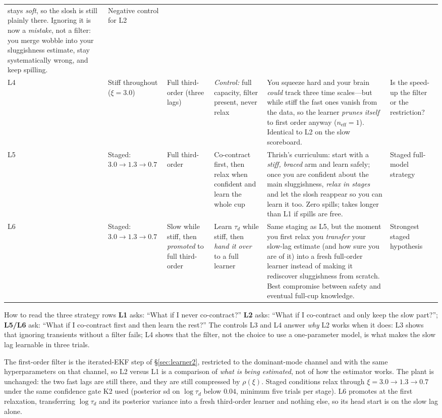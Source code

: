 \documentclass[11pt,a4paper]{article}
\newcommand{\neff}{n_{\mathrm{eff}}}
\begin{document}
\begin{longtable}{@{}p{0.7cm}p{1.5cm}p{2.0cm}p{2.2cm}p{4.8cm}p{2.6cm}@{}}
stays \emph{soft}, so the slosh is still plainly there.  Ignoring it is
now a \emph{mistake}, not a filter: you merge wobble into your sluggishness
estimate, stay systematically wrong, and keep spilling. &
Negative control for L2 \\
\addlinespace
L4 &
Stiff throughout ($\xi=3.0$) &
Full third-order (three lags) &
\emph{Control:} full capacity, filter present, never relax &
You squeeze hard and your brain \emph{could} track three time scales---but
while stiff the fast ones vanish from the data, so the learner \emph{prunes
itself} to first order anyway ($\neff=1$).  Identical to L2 on the slow
scoreboard. &
Is the speed-up the filter or the restriction? \\
\addlinespace
L5 &
Staged: $3.0\to1.3\to0.7$ &
Full third-order &
Co-contract first, then relax when confident and learn the whole cup &
Thrish's curriculum: start with a \emph{stiff, braced} arm and learn safely;
once you are confident about the main sluggishness, \emph{relax in stages}
and let the slosh reappear so you can learn it too.  Zero spills; takes
longer than L1 if spills are free. &
Staged full-model strategy \\
\addlinespace
L6 &
Staged: $3.0\to1.3\to0.7$ &
Slow while stiff, then \emph{promoted} to full third-order &
Learn $\tau_d$ while stiff, then \emph{hand it over} to a full learner &
Same staging as L5, but the moment you first relax you \emph{transfer} your
slow-lag estimate (and how sure you are of it) into a fresh full-order
learner instead of making it rediscover sluggishness from scratch.  Best
compromise between safety and eventual full-cup knowledge. &
Strongest staged hypothesis \\
\bottomrule
\end{longtable}
\normalsize

\begin{examplebox}{How to read the three strategy rows}
\textbf{L1} asks: ``What if I never co-contract?''\;
\textbf{L2} asks: ``What if I co-contract and only keep the slow part?'';
\textbf{L5/L6} ask: ``What if I co-contract first and then learn the rest?''
The controls L3 and L4 answer \emph{why} L2 works when it does: L3 shows
that ignoring transients without a filter fails; L4 shows that the filter,
not the choice to use a one-parameter model, is what makes the slow lag
learnable in three trials.
\end{examplebox}

The first-order filter is the iterated-EKF step of \S\ref{sec:learner2},
restricted to the dominant-mode channel and with the same hyperparameters on
that channel, so L2 versus L1 is a comparison of \emph{what is being
estimated}, not of how the estimator works. The plant is unchanged: the two
fast lags are still there, and they are still compressed by $\rho(\xi)$.
Staged conditions relax through $\xi = 3.0 \to 1.3 \to 0.7$ under the same
confidence gate K2 used (posterior sd on $\log\tau_d$ below $0.04$, minimum
five trials per stage). L6 promotes at the first relaxation, transferring
$\log\tau_d$ and its posterior variance into a fresh third-order learner and
nothing else, so its head start is on the slow lag alone.
\end{document}
